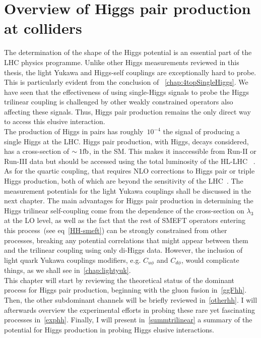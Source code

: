 
\chapter{ Overview of Higgs pair production at colliders }\label{chap:overviewDiHiggs}
The determination of the shape of the Higgs potential is an essential part of the LHC physics programme. Unlike other Higgs measurements reviewed in this thesis, the light Yukawa and Higgs-self couplings are exceptionally hard to probe.  This is particularly evident from the conclusion of ~\autoref{chap:4topSingleHiggs}. We have seen that the effectiveness of using single-Higgs signals to probe the Higgs trilinear coupling is challenged by other weakly constrained operators also affecting these signals. Thus, Higgs pair production remains the only direct way to access this elusive interaction. \\ The production of Higgs in pairs has roughly~$ 10^{-4} $ the signal of producing a single Higgs at the LHC. Higgs pair production, with Higgs, decays considered, has a cross-section of $ \sim 1 \si{\femtobarn}$, in the SM. This makes it inaccessible from Run-II or Run-III data but should be accessed using the total luminosity of the HL-LHC ~\cite{Apollinari:2015bam, ATL-PHYS-PUB-2018-053, Cepeda:2019klc}. As for the quartic coupling, that requires NLO corrections to Higgs pair or triple Higgs production, both of which are beyond the sensitivity of the LHC~\cite{Plehn:2005nk}. The measurement potentials for the light Yukawa couplings shall be discussed in the next chapter.   The main advantages for Higgs pair production in determining the Higgs trilinear self-coupling come from the dependence of the cross-section on $\lambda_3$ at the LO level, as well as the fact that the rest of SMEFT operators entering this process~(see eq~\eqref{HH-smeft}) can be strongly constrained from other processes, breaking any potential correlations that might appear between them and the trilinear coupling using only di-Higgs data. However, the inclusion of light quark Yukawa couplings modifiers, e.g. $ C_{u\phi}$ and $C_{d \phi}$, would complicate things, as we shall see in~\autoref{chap:lightyuk}. \\
This chapter will start by reviewing the theoretical status of the dominant process for Higgs pair production, beginning with the gluon fusion in~\autoref{ggFhh}. Then, the other subdominant channels will be briefly reviewed in~\autoref{otherhh}. I will afterwards overview the experimental efforts in probing these rare yet fascinating processes in~\autoref{exphh}. Finally, I will present  in~\autoref{summtrilinear} a summary of the potential for Higgs production in probing Higgs elusive interactions.
